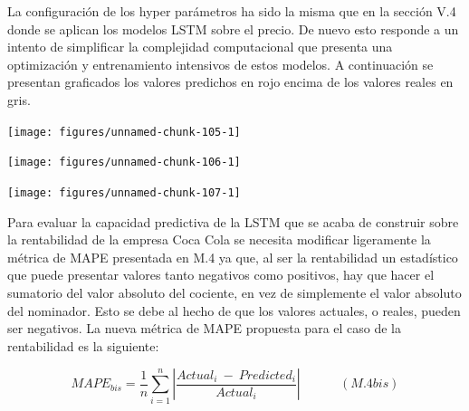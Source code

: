 \documentclass[]{DissertateUSU}
\begin{document}
\setlength\parskip{5ex}
\justifying

\noindent La configuración de los hyper parámetros ha sido la misma que
en la sección V.4 donde se aplican los modelos LSTM sobre el precio. De
nuevo esto responde a un intento de simplificar la complejidad
computacional que presenta una optimización y entrenamiento intensivos
de estos modelos. A continuación se presentan graficados los valores
predichos en rojo encima de los valores reales en gris.

\begin{center}\texttt{[image: figures/unnamed-chunk-105-1]} \end{center}
\centering

\setlength\parskip{5ex}
\justifying

\begin{center}\texttt{[image: figures/unnamed-chunk-106-1]} \end{center}
\centering

\setlength\parskip{5ex}
\justifying

\begin{center}\texttt{[image: figures/unnamed-chunk-107-1]} \end{center}
\centering

\setlength\parskip{5ex}
\justifying

\noindent Para evaluar la capacidad predictiva de la LSTM que se acaba
de construir sobre la rentabilidad de la empresa Coca Cola se necesita
modificar ligeramente la métrica de MAPE presentada en M.4 ya que, al
ser la rentabilidad un estadístico que puede presentar valores tanto
negativos como positivos, hay que hacer el sumatorio del valor absoluto
del cociente, en vez de simplemente el valor absoluto del nominador.
Esto se debe al hecho de que los valores actuales, o reales, pueden ser
negativos. La nueva métrica de MAPE propuesta para el caso de la
rentabilidad es la siguiente:

\[MAPE_{bis} = \frac{1}{n}\sum_{i=1}^{n}\left | \frac{Actual_i \ -\ Predicted_i}{Actual_i}\right | \ \ \ \ \ \ \ \ \ \ \ \ \ \ (M.4bis)\]
\setlength\parskip{5ex}
\end{document}
